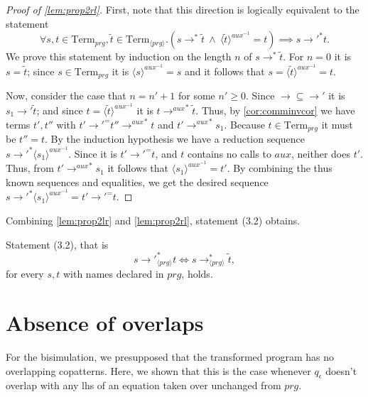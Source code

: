 \begin{proof}[Proof of \autoref{lem:prop2rl}]

First, note that this direction is logically equivalent to the statement
\[
\forall s, t \in \textrm{Term}_{prg}, \widetilde{t} \in \textrm{Term}_{\langle prg \rangle}. (s \longrightarrow^* \widetilde{t} ~ \land ~ \langle \widetilde{t} \rangle^{aux^{-1}} = t) \implies s {\longrightarrow'}^* t.
\]
We prove this statement by induction on the length $n$ of $s \longrightarrow^* \widetilde{t}$. For $n = 0$ it is $s = \widetilde{t}$; since $s \in \textrm{Term}_{prg}$ it is $\langle s \rangle^{aux^{-1}} = s$ and it follows that $s = \langle \widetilde{t} \rangle^{aux^{-1}} = t$. 

Now, consider the case that $n = n'+1$ for some $n' \geq 0$. Since $\longrightarrow \subseteq \longrightarrow'$ it is $s_1 \longrightarrow' \widetilde{t}$; and since $t = \langle \widetilde{t} \rangle^{aux^{-1}}$ it is $t {\longrightarrow^{aux}}^* \widetilde{t}$. Thus, by \autoref{cor:comminvcor} we have terms $t', t''$ with $t' {\longrightarrow'}^= t'' {\longrightarrow^{aux}}^* t$ and $t' {\longrightarrow^{aux}}^* s_1$. Because $t \in \textrm{Term}_{prg}$ it must be $t'' = t$. By the induction hypothesis we have a reduction sequence $s {\longrightarrow'}^* \langle s_1 \rangle^{aux^{-1}}$. Since it is $t' {\longrightarrow'}^= t$, and $t$ contains no calls to $aux$, neither does $t'$. Thus, from $t' {\longrightarrow^{aux}}^* s_1$ it follows that $\langle s_1 \rangle^{aux^{-1}} = t'$. By combining the thus known sequences and equalities, we get the desired sequence $s {\longrightarrow'}^* \langle s_1 \rangle^{aux^{-1}} = t' {\longrightarrow'}^= t$.

\end{proof}

Combining \autoref{lem:prop2lr} and \autoref{lem:prop2rl}, statement (3.2) obtains.
\begin{proposition}
\label{prop:bisim2}
Statement (3.2), that is
\[
s {\longrightarrow'}_{\langle prg \rangle}^* t \iff s \longrightarrow^*_{\langle prg \rangle} \widetilde{t},
\]
for every $s, t$ with names declared in $prg$, holds.
\end{proposition}

\section{Absence of overlaps}
\label{sec:extrovl}

For the bisimulation, we presupposed that the transformed program has no overlapping copatterns. Here, we shown that this is the case whenever $q_\epsilon$ doesn't overlap with any lhs of an equation taken over unchanged from $prg$.

